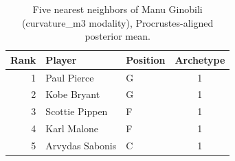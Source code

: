 \begin{table}[htbp]
  \centering\small
  \begin{tabular}{rllc}
    \toprule
    Rank & Player & Position & Archetype \\
    \midrule
    1 & Paul Pierce & G & 1 \\
    2 & Kobe Bryant & G & 1 \\
    3 & Scottie Pippen & F & 1 \\
    4 & Karl Malone & F & 1 \\
    5 & Arvydas Sabonis & C & 1 \\
    \bottomrule
  \end{tabular}
  \caption{Five nearest neighbors of Manu Ginobili (curvature_m3 modality), Procrustes-aligned posterior mean.}
  \label{tab:Manu_Ginobili_neighbors_curvature_m3}
\end{table}

